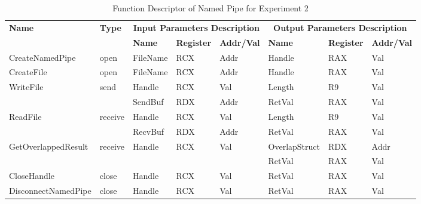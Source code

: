 \begin{table}[H]
  \centering
  \caption{Function Descriptor of Named Pipe for Experiment 2}
  \label{fdescexp2}
\begin{tabular}{|l|l|l|l|l|l|l|l|}
\hline
             \multirow{2}{*}{{\textbf{Name}}} & \multirow{2}{*}{{\textbf{Type}}} & \multicolumn{3}{c|}{\textbf{Input Parameters Description}} & \multicolumn{3}{c|}{\textbf{Output Parameters Description}} \\
              \cline{3-8} 
             & & \textbf{Name}& \textbf{Register} & \textbf{Addr/Val} & \textbf{Name}& \textbf{Register} &  \textbf{Addr/Val}  \\
             \hline
      CreateNamedPipe
       &open & FileName & RCX  & Addr &  Handle & RAX & Val\\
      \hline         
      CreateFile
       &open & FileName & RCX & Addr&  Handle & RAX & Val\\ 
      \hline              
      \multirow{2}{*}{WriteFile}
       &\multirow{2}{*}{send} &  Handle & RCX & Val & Length & R9 & Val\\
        \cline{3-8} 
       & & SendBuf & RDX & Addr & RetVal& RAX & Val\\
      \hline            
      \multirow{2}{*}{ReadFile}
       &\multirow{2}{*}{receive} &  Handle & RCX & Val& Length & R9 & Val\\
        \cline{3-8} 
       & & RecvBuf & RDX  & Addr & RetVal& RAX & Val\\
      \hline    
           \multirow{2}{*}{GetOverlappedResult} &
       \multirow{2}{*}{receive} &  \multirow{2}{*}{Handle} & \multirow{2}{*}{RCX} & \multirow{2}{*}{Val} &OverlapStruct &RDX & Addr\\
               \cline{6-8} 
       & &  &   &  & RetVal& RAX & Val\\
      \hline     
      CloseHandle &
       close &  Handle & RCX & Val & RetVal& RAX & Val\\
      \hline            
      DisconnectNamedPipe &
      close &  Handle & RCX & Val & RetVal& RAX & Val\\
      \hline               
  \end{tabular}  
\end{table} 

